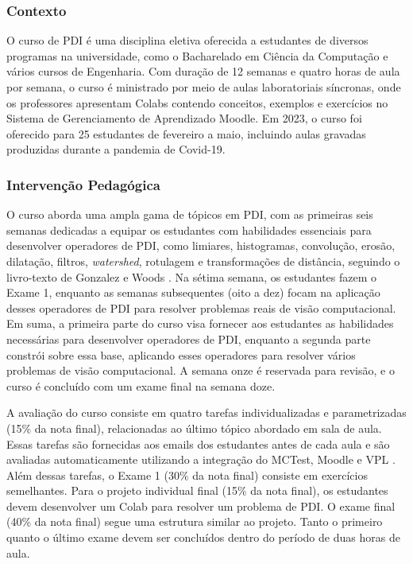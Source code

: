 \subsubsection{Contexto} \label{sec:cont}

O curso de PDI é uma disciplina eletiva oferecida a estudantes de diversos programas na universidade, como o Bacharelado em Ciência da Computação e vários cursos de Engenharia. Com duração de 12 semanas e quatro horas de aula por semana, o curso é ministrado por meio de aulas laboratoriais síncronas, onde os professores apresentam Colabs contendo conceitos, exemplos e exercícios no Sistema de Gerenciamento de Aprendizado Moodle. Em 2023, o curso foi oferecido para 25 estudantes de fevereiro a maio, incluindo aulas gravadas produzidas durante a pandemia de Covid-19.

\subsubsection{Intervenção Pedagógica} \label{sec:pi}

O curso aborda uma ampla gama de tópicos em PDI, com as primeiras seis semanas dedicadas a equipar os estudantes com habilidades essenciais para desenvolver operadores de PDI, como limiares, histogramas, convolução, erosão, dilatação, filtros, \textit{watershed}, rotulagem e transformações de distância, seguindo o livro-texto de Gonzalez e Woods \cite{gonzalez2009processamento}. Na sétima semana, os estudantes fazem o Exame 1, enquanto as semanas subsequentes (oito a dez) focam na aplicação desses operadores de PDI para resolver problemas reais de visão computacional. Em suma, a primeira parte do curso visa fornecer aos estudantes as habilidades necessárias para desenvolver operadores de PDI, enquanto a segunda parte constrói sobre essa base, aplicando esses operadores para resolver vários problemas de visão computacional. A semana onze é reservada para revisão, e o curso é concluído com um exame final na semana doze.

A avaliação do curso consiste em quatro tarefas individualizadas e parametrizadas (15\% da nota final), relacionadas ao último tópico abordado em sala de aula. Essas tarefas são fornecidas aos emails dos estudantes antes de cada aula e são avaliadas automaticamente utilizando a integração do MCTest, Moodle e VPL \cite{2020:Zampirolli.Pisani.ea,2021:Zampirolli.Sato.ea}. Além dessas tarefas, o Exame 1 (30\% da nota final) consiste em exercícios semelhantes. Para o projeto individual final (15\% da nota final), os estudantes devem desenvolver um Colab para resolver um problema de PDI. O exame final (40\% da nota final) segue uma estrutura similar ao projeto. Tanto o primeiro quanto o último exame devem ser concluídos dentro do período de duas horas de aula.

